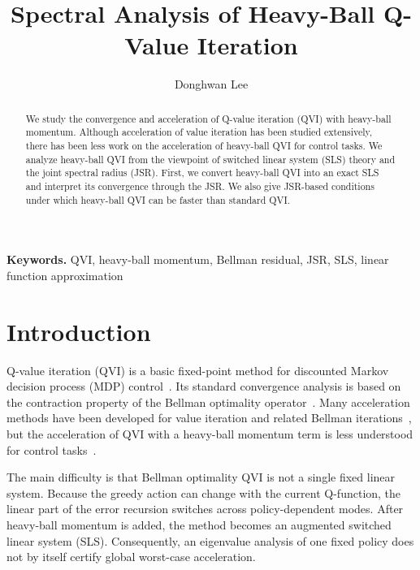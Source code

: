 \documentclass[letterpaper]{article}
\title{Spectral Analysis of Heavy-Ball Q-Value Iteration}
\author{Donghwan Lee}
\numberwithin{equation}{section}
\begin{document}
\maketitle

\begin{abstract}
We study the convergence and acceleration of Q-value iteration (QVI) with
heavy-ball momentum. Although acceleration of value iteration has been
studied extensively, there has been less work on the acceleration of heavy-ball
QVI for control tasks. We analyze heavy-ball QVI from the viewpoint of
switched linear system (SLS) theory and the joint spectral radius (JSR). First, we
convert heavy-ball QVI into an exact SLS and interpret its
convergence through the JSR. We also give JSR-based conditions under
which heavy-ball QVI can be faster than standard QVI.
\end{abstract}

\begin{center}
\small
\textbf{Keywords.}
QVI, heavy-ball momentum, Bellman residual, JSR,
SLS, linear function approximation
\end{center}


\section{Introduction}
\label{sec:introduction}

Q-value iteration (QVI) is a basic fixed-point method for discounted Markov
decision process (MDP) control~\citep{puterman1994markov,bertsekas1996neuro}. Its
standard convergence analysis is based on the contraction property of the Bellman
optimality operator~\citep{puterman1994markov,bertsekas1996neuro}. Many
acceleration methods have been developed for value iteration and related Bellman
iterations~\citep{bertsekas1995rankone,farahmand2021pid,goyal2022firstorder},
but the acceleration of QVI with a heavy-ball momentum term is less understood
for control tasks~\citep{farahmand2021pid,goyal2022firstorder,weng2019momentum}.

The main difficulty is that Bellman optimality QVI is not a single fixed linear
system. Because the greedy action can change with the current Q-function, the
linear part of the error recursion switches across policy-dependent modes. After
heavy-ball momentum is added, the method becomes an augmented switched linear
system (SLS). Consequently, an eigenvalue analysis of one fixed policy does not
by itself certify global worst-case acceleration.
\end{document}
